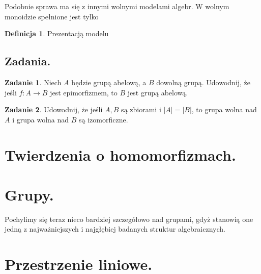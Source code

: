 \documentclass{article}
\theoremstyle{definition}
\newtheorem{definition}{Definicja}[section]
\newtheorem{exercise}{Zadanie}[section]
\begin{document}
Podobnie sprawa ma się z innymi wolnymi modelami algebr.
W wolnym monoidzie spełnione jest tylko
	

\begin{definition}
    Prezentacją modelu
\end{definition}

\subsection{Zadania.}
\begin{exercise}
	Niech $A$ będzie grupą abelową, a $B$ dowolną grupą.
	Udowodnij, że jeśli $f: A \to B$ jest epimorfizmem,
		to $B$ jest grupą abelową.
\end{exercise}

\begin{exercise}
	Udowodnij, że jeśli $A, B$ są zbiorami i $|A| = |B|$,
		to grupa wolna nad $A$ i grupa wolna nad $B$ są izomorficzne.
\end{exercise}

\section{Twierdzenia o homomorfizmach.}

\section{Grupy.}

Pochylimy się teraz nieco bardziej szczegółowo nad grupami,
gdyż stanowią one jedną z najważniejszych i najgłębiej badanych struktur algebraicznych.



\section{Przestrzenie liniowe.}
\end{document}
